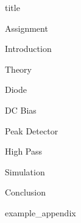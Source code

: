 \documentclass{article}
\begin{document}
{title}

\frontmatter

\tableofcontents

\listoffigures

\mainmatter

{Assignment}

{Introduction}

{Theory}

{Diode}

{DC Bias}

{Peak Detector}

{High Pass}

{Simulation}

{Conclusion}

\nocite{*} 
\newpage
\printbibliography[heading = bibintoc, title = Bibliography]    %

\addappendix
{example_appendix}

\end{document}
